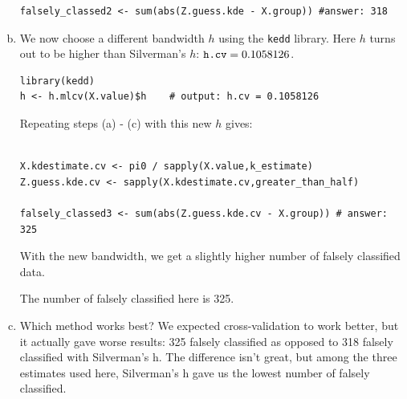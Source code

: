 \documentclass[12pt]{article}
\begin{document}
\begin{enumerate}[(a)]
\begin{verbatim}
falsely_classed2 <- sum(abs(Z.guess.kde - X.group)) #answer: 318
\end{verbatim}

\item We now choose a different bandwidth $h$ using the \texttt{kedd} library. Here $h$ turns out to be higher than Silverman's $h$: $\text{\texttt{h.cv}} = 0.1058126$.
\begin{verbatim}
library(kedd)
h <- h.mlcv(X.value)$h    # output: h.cv = 0.1058126
\end{verbatim}

Repeating steps (a) - (c) with this new $h$ gives:
\begin{verbatim}

X.kdestimate.cv <- pi0 / sapply(X.value,k_estimate)
Z.guess.kde.cv <- sapply(X.kdestimate.cv,greater_than_half)

falsely_classed3 <- sum(abs(Z.guess.kde.cv - X.group)) # answer: 325
\end{verbatim}

With the new bandwidth, we get a slightly higher number of falsely classified data. 

The number of falsely classified here is 325.


\item Which method works best? We expected cross-validation to work better, but it actually gave worse results: 325 falsely classified as opposed to 318 falsely classified with Silverman's h. The difference isn't great, but among the three estimates used here, Silverman's h gave us the lowest number of falsely classified.
 \end{enumerate}
\end{document}
